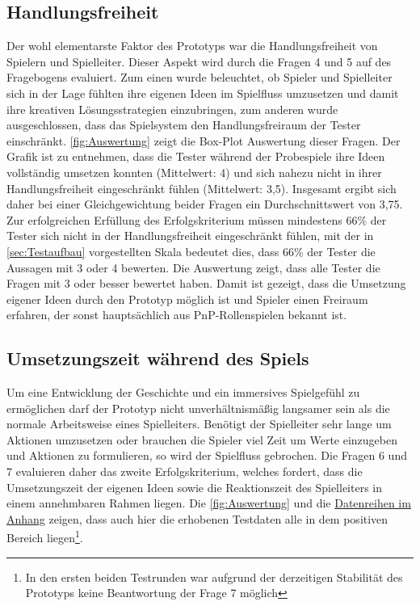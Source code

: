 \subsection{Handlungsfreiheit}
\label{sec:Handlungsfreiheit}
Der wohl elementarste Faktor des Prototyps war die Handlungsfreiheit von Spielern und Spielleiter. Dieser Aspekt wird durch die Fragen 4 und 5 auf des Fragebogens evaluiert. Zum einen wurde beleuchtet, ob Spieler und Spielleiter sich in der Lage fühlten ihre eigenen Ideen im Spielfluss umzusetzen und damit ihre kreativen Lösungsstrategien einzubringen, zum anderen wurde ausgeschlossen, dass das Spielsystem den Handlungsfreiraum der Tester einschränkt.\newline
\ref{fig:Auswertung} zeigt die Box-Plot Auswertung dieser Fragen. Der Grafik ist zu entnehmen, dass die Tester während der Probespiele ihre Ideen vollständig umsetzen konnten (Mittelwert: 4) und sich nahezu nicht in ihrer Handlungsfreiheit eingeschränkt fühlen (Mittelwert: 3,5). Insgesamt ergibt sich daher bei einer Gleichgewichtung beider Fragen ein Durchschnittswert von 3,75. Zur erfolgreichen Erfüllung des Erfolgskriterium müssen mindestens 66\% der Tester sich nicht in der Handlungsfreiheit eingeschränkt fühlen, mit der in \ref{sec:Testaufbau} vorgestellten Skala bedeutet dies, dass 66\% der Tester die Aussagen mit 3 oder 4 bewerten.\newline
Die Auswertung zeigt, dass alle Tester die Fragen mit 3 oder besser bewertet haben. Damit ist gezeigt, dass die Umsetzung eigener Ideen durch den Prototyp möglich ist und Spieler einen Freiraum erfahren, der sonst hauptsächlich aus PnP-Rollenspielen bekannt ist.


	

\subsection{Umsetzungszeit während des Spiels}
\label{sec:Umsetzungszeit}
Um eine Entwicklung der Geschichte und ein immersives Spielgefühl zu ermöglichen darf der Prototyp nicht unverhältnismäßig langsamer sein als die normale Arbeitsweise eines Spielleiters. Benötigt der Spielleiter sehr lange um Aktionen umzusetzen oder brauchen die Spieler viel Zeit um Werte einzugeben und Aktionen zu formulieren, so wird der Spielfluss gebrochen. Die Fragen 6 und 7 evaluieren daher das zweite Erfolgskriterium, welches fordert, dass die Umsetzungszeit der eigenen Ideen sowie die Reaktionszeit des Spielleiters in einem annehmbaren Rahmen liegen.
Die \ref{fig:Auswertung} und die \hyperref[fig:tableData]{Datenreihen im Anhang} zeigen, dass auch hier die erhobenen Testdaten alle in dem positiven Bereich liegen\footnote{In den ersten beiden Testrunden war aufgrund der derzeitigen Stabilität des Prototyps keine Beantwortung der Frage 7 möglich}.

